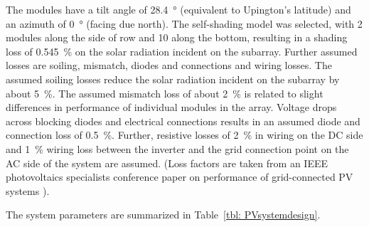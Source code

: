 
The modules have a tilt angle of \SI{28.4}{\degree} (equivalent to Upington's latitude) and an azimuth of \SI{0}{\degree} (facing due north). The self-shading model was selected, with \num{2} modules along the side of row and \num{10} along the bottom, resulting in a shading loss of \SI{0.545}{\percent} on the solar radiation incident on the subarray. Further assumed losses are soiling, mismatch, diodes and connections and wiring losses. The assumed soiling losses reduce the solar radiation incident on the subarray by about \SI{5}{\percent}. The assumed mismatch loss of about \SI{2}{\percent} is related to slight differences in performance of individual modules in the array. Voltage drops across blocking diodes and electrical connections results in an assumed diode and connection loss of \SI{0.5}{\percent}. Further, resistive losses of \SI{2}{\percent} in wiring on the DC side and \SI{1}{\percent} wiring loss between the inverter and the grid connection point on the AC side of the system are assumed. (Loss factors are taken from an IEEE photovoltaics specialists conference paper on performance of grid-connected PV systems \cite{Marion2005}).

The system parameters are summarized in Table~\ref{tbl: PVsystemdesign}.


